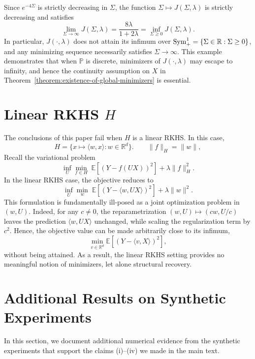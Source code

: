 \documentclass[sn-mathphys-num]{sn-jnl}%
\numberwithin{equation}{section}
\newcommand{\R}{\mathbb{R}}
\newcommand{\E}{\mathbb{E}}
\renewcommand{\P}{\mathbb{P}}
\newcommand{\Sym}{{\rm \mathrm{Sym}}}
\theoremstyle{thmstyleone}%
\theoremstyle{thmstyletwo}%
\theoremstyle{thmstylethree}%
\begin{document}
Since $e^{-4\Sigma}$ is strictly decreasing in $\Sigma$, the function
$\Sigma\mapsto J(\Sigma,\lambda)$ is strictly decreasing and satisfies
\[
\lim_{\Sigma\to\infty} J(\Sigma,\lambda)
=
\frac{8\lambda}{1+2\lambda} = \inf_{\Sigma \ge 0} J(\Sigma,\lambda).
\]
In particular, $J(\cdot,\lambda)$ does not attain its infimum over $\Sym_+^1 = \{\Sigma \in \R: \Sigma \ge 0\}$,
and any minimizing sequence necessarily satisfies $\Sigma\to\infty$.
This example demonstrates that when $\P$ is discrete, minimizers of $J(\cdot,\lambda)$
may escape to infinity, and hence the continuity assumption on $X$ in
Theorem~\ref{theorem:existence-of-global-minimizers} is essential.



\section{Linear RKHS $H$}
\label{sec:linear-vs-nonlinear} 
The conclusions of this paper fail when $H$ is a linear RKHS. In this case,
\begin{equation*}
	H = \bigl\{ x \mapsto \langle w, x \rangle : w \in \R^d \bigr\}.
	\qquad 
	\|f\|_H = \|w\| ,
\end{equation*}
Recall the variational problem
\begin{equation*}
	\inf_U \min_{f \in H} \; \E[(Y - f(UX))^2] + \lambda \|f\|_H^2.
\end{equation*}
In the linear RKHS case, the objective reduces to
\begin{equation*}
	\inf_U \min_{w} \; \E[(Y - \langle w, UX \rangle)^2] + \lambda \|w\|^2 .
\end{equation*}
This formulation is fundamentally ill-posed as a joint optimization problem in $(w,U)$. 
Indeed, for any $c \neq 0$, the reparametrization $(w,U) \mapsto (c w, U/c)$ leaves the prediction
$\langle w, UX \rangle$ unchanged, while scaling the regularization term by $c^2$.
Hence, the objective value can be made arbitrarily close to its infimum,
\begin{equation*}
	\min_{v \in \R^d} \E[(Y - \langle v, X \rangle)^2],
\end{equation*}
without being attained. As a result, the linear RKHS setting 
provides no meaningful notion of minimizers, let alone structural recovery.




\newpage

\section{Additional Results on Synthetic Experiments} 
\label{sec:additional-plots}
In this section, we document additional numerical evidence from the synthetic experiments 
that support the claims (i)--(iv) we made in the main text. 
\end{document}
